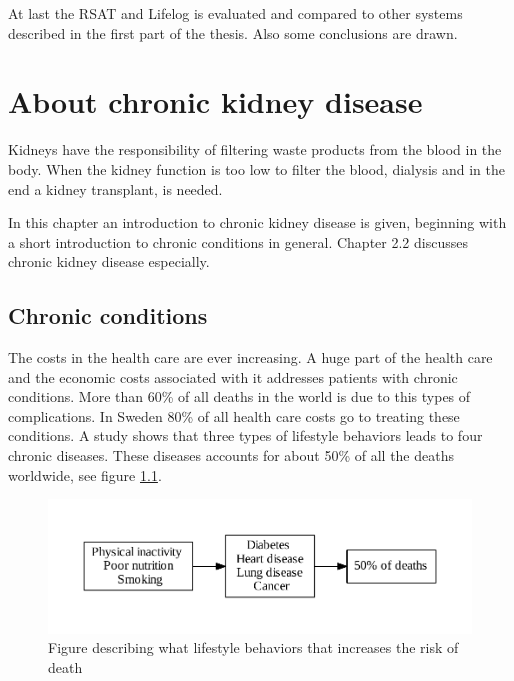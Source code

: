 \documentclass{cslthse-msc}
\begin{document}
At last the RSAT and Lifelog is evaluated and compared to other systems described in the first part of the thesis. Also some conclusions are drawn.




\chapter{About chronic kidney disease}

Kidneys have the responsibility of filtering waste products from the blood in the body\cite{NKDEPBASICS}. When the kidney function is too low to filter the blood, dialysis and in the end a kidney transplant, is needed.

In this chapter an introduction to chronic kidney disease is given, beginning with a short introduction to chronic conditions in general. Chapter 2.2 discusses chronic kidney disease especially.
  
\section{Chronic conditions}

The costs in the health care are ever increasing. A huge part of the health care and the economic costs associated with it addresses patients with chronic conditions. More than 60\% of all deaths in the world is due to this types of complications. In Sweden 80\% of all health care costs go to treating these conditions\cite{SmartCare}. A study shows that three types of lifestyle behaviors  leads to four chronic diseases. These diseases accounts for about 50\% of all the deaths worldwide, see figure \ref{fig:chronic-fig}\cite{callaway2015quantified}.

\begin{figure}[!hbt]
\centering
\includegraphics[scale=0.8]{chronic-fig.pdf} 
\caption{Figure  describing what lifestyle behaviors that increases the risk of death}\label{fig:chronic-fig}
\end{figure}
\end{document}
